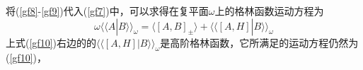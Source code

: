 将(\ref{gf8}-\ref{gf9})代入(\ref{gf7})中，可以求得在复平面$\omega$上的格林函数运动方程为
\begin{equation}
\omega\langle\langle A|B\rangle\rangle_\omega=\langle\left[A,B\right]_\pm\rangle+\langle\langle\left[A,H\right]|B\rangle\rangle_\omega\label{gf10}
\end{equation}
上式(\ref{gf10})右边的的$\langle\langle\left[A,H\right]|B\rangle\rangle_\omega$是高阶格林函数，它所满足的运动方程仍然为(\ref{gf10})，

















